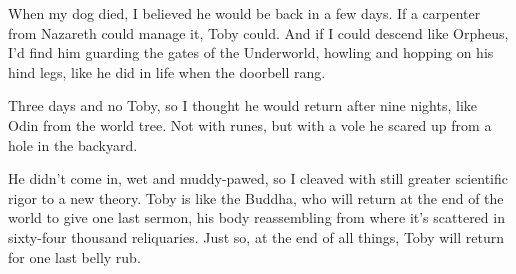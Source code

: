 
When my dog died, I believed he would be back in a few days. If a
carpenter from Nazareth could manage it, Toby could. And if I could
descend like Orpheus, I'd find him guarding the gates of the Underworld,
howling and hopping on his hind legs, like he did in life when the
doorbell rang.

Three days and no Toby, so I thought he would return after nine nights,
like Odin from the world tree. Not with runes, but with a vole he scared
up from a hole in the backyard.

He didn't come in, wet and muddy-pawed, so I cleaved with still greater
scientific rigor to a new theory. Toby is like the Buddha, who will
return at the end of the world to give one last sermon, his body
reassembling from where it's scattered in sixty-four thousand
reliquaries. Just so, at the end of all things, Toby will return for one
last belly rub.
